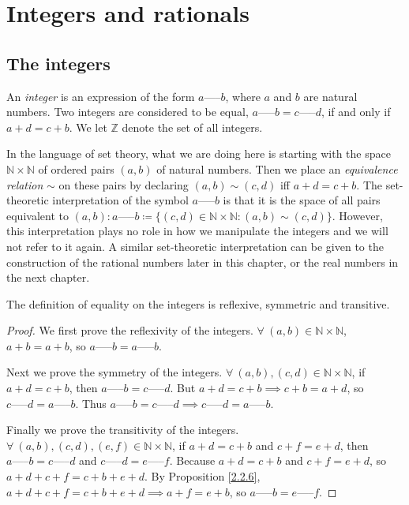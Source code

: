 \chapter{Integers and rationals}
\section{The integers}

\begin{definition}[Integers]\label{4.1.1}
An \emph{integer} is an expression of the form \(a \text{-----} b\), where \(a\) and \(b\) are natural numbers.
Two integers are considered to be equal, \(a \text{-----} b = c \text{-----} d\), if and only if \(a + d = c + b\).
We let \(\mathds{Z}\) denote the set of all integers.
\end{definition}

\begin{note}
In the language of set theory, what we are doing here is starting with the space \(\mathds{N} \times \mathds{N}\) of ordered pairs \((a, b)\) of natural numbers.
Then we place an \emph{equivalence relation} \(\sim\) on these pairs by declaring \((a, b) \sim (c, d)\) iff \(a + d = c + b\).
The set-theoretic interpretation of the symbol \(a \text{-----} b\) is that it is the space of all pairs equivalent to \((a, b): a \text{-----} b \coloneqq \{(c, d) \in \mathds{N} \times \mathds{N} : (a, b) \sim (c, d)\}\).
However, this interpretation plays no role in how we manipulate the integers and we will not refer to it again.
A similar set-theoretic interpretation can be given to the construction of the rational numbers later in this chapter, or the real numbers in the next chapter.
\end{note}

\begin{additional corollary}\label{ac 4.1.1}
The definition of equality on the integers is reflexive, symmetric and transitive.
\end{additional corollary}

\begin{proof}
We first prove the reflexivity of the integers.
\(\forall\ (a, b) \in \mathds{N} \times \mathds{N}\), \(a + b = a + b\), so \(a \text{-----} b = a \text{-----} b\).

Next we prove the symmetry of the integers.
\(\forall\ (a, b), (c, d) \in \mathds{N} \times \mathds{N}\), if \(a + d = c + b\), then \(a \text{-----} b = c \text{-----} d\).
But \(a + d = c + b \implies c + b = a + d\), so \(c \text{-----} d = a \text{-----} b\).
Thus \(a \text{-----} b = c \text{-----} d \implies c \text{-----} d = a \text{-----} b\).

Finally we prove the transitivity of the integers.
\(\forall\ (a, b), (c, d), (e, f) \in \mathds{N} \times \mathds{N}\), if \(a + d = c + b\) and \(c + f = e + d\), then \(a \text{-----} b = c \text{-----} d\) and \(c \text{-----} d = e \text{-----} f\).
Because \(a + d = c + b\) and \(c + f = e + d\), so \(a + d + c + f = c + b + e + d\).
By Proposition \ref{2.2.6}, \(a + d + c + f = c + b + e + d \implies a + f = e + b\), so \(a \text{-----} b = e \text{-----} f\).
\end{proof}

